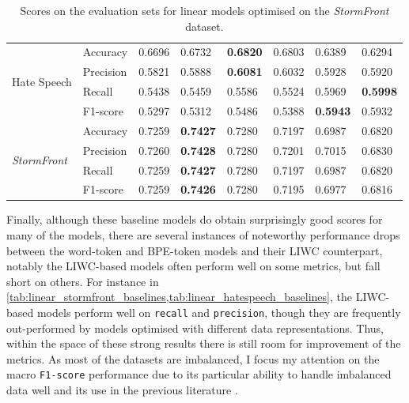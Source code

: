 \begin{table}
{\begin{tabular}{ll|ll|ll|ll}
    \multirow{4}{*}{Hate Speech}          & Accuracy  & 0.6696      & 0.6732        & \bf{0.6820} & 0.6803      & 0.6389      & 0.6294      \\
                                          & Precision & 0.5821      & 0.5888        & \bf{0.6081} & 0.6032      & 0.5928      & 0.5920      \\
                                          & Recall    & 0.5438      & 0.5459        & 0.5586      & 0.5524      & 0.5969      & \bf{0.5998} \\
                                          & F1-score  & 0.5297      & 0.5312        & 0.5486      & 0.5388      & \bf{0.5943} & 0.5932      \\\hline
    \multirow{4}{*}{\textit{StormFront}}  & Accuracy  & 0.7259      & \bf{0.7427}   & 0.7280      & 0.7197      & 0.6987      & 0.6820      \\
                                          & Precision & 0.7260      & \bf{0.7428}   & 0.7280      & 0.7201      & 0.7015      & 0.6830      \\
                                          & Recall    & 0.7259      & \bf{0.7427}   & 0.7280      & 0.7197      & 0.6987      & 0.6820      \\
                                          & F1-score  & 0.7259      & \bf{0.7426}   & 0.7280      & 0.7195      & 0.6977      & 0.6816
    \end{tabular}%
    }
    \caption{Scores on the evaluation sets for linear models optimised on the \textit{StormFront} dataset.}
    \label{tab:linear_stormfront_baselines}
\end{table}

Finally, although these baseline models do obtain surprisingly good scores for many of the models, there are several instances of noteworthy performance drops between the word-token and BPE-token models and their LIWC counterpart, notably the LIWC-based models often perform well on some metrics, but fall short on others.
For instance in \cref{tab:linear_stormfront_baselines,tab:linear_hatespeech_baselines}, the LIWC-based models perform well on \texttt{recall} and \texttt{precision}, though they are frequently out-performed by models optimised with different data representations.
Thus, within the space of these strong results there is still room for improvement of the metrics.
As most of the datasets are imbalanced, I focus my attention on the macro \texttt{F1-score} performance due to its particular ability to handle imbalanced data well and its use in the previous literature \citep{Fortuna:2021}.

